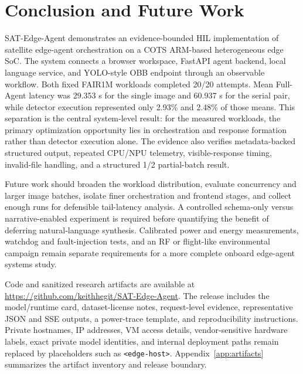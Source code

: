 \documentclass[10pt,letterpaper]{article}
\renewcommand{\thesection}{\Roman{section}}
\begin{document}
\section{Conclusion and Future Work}

SAT-Edge-Agent demonstrates an evidence-bounded HIL implementation of satellite edge-agent orchestration on a COTS ARM-based heterogeneous edge SoC. The system connects a browser workspace, FastAPI agent backend, local language service, and YOLO-style OBB endpoint through an observable workflow. Both fixed FAIR1M workloads completed 20/20 attempts. Mean Full-Agent latency was 29.353 s for the single image and 60.937 s for the serial pair, while detector execution represented only 2.93\% and 2.48\% of those means. This separation is the central system-level result: for the measured workloads, the primary optimization opportunity lies in orchestration and response formation rather than detector execution alone. The evidence also verifies metadata-backed structured output, repeated CPU/NPU telemetry, visible-response timing, invalid-file handling, and a structured 1/2 partial-batch result.

Future work should broaden the workload distribution, evaluate concurrency and larger image batches, isolate finer orchestration and frontend stages, and collect enough runs for defensible tail-latency analysis. A controlled schema-only versus narrative-enabled experiment is required before quantifying the benefit of deferring natural-language synthesis. Calibrated power and energy measurements, watchdog and fault-injection tests, and an RF or flight-like environmental campaign remain separate requirements for a more complete onboard edge-agent systems study.

Code and sanitized research artifacts are available at \url{https://github.com/keithhegit/SAT-Edge-Agent}. The release includes the model/runtime card, dataset-license notes, request-level evidence, representative JSON and SSE outputs, a power-trace template, and reproducibility instructions. Private hostnames, IP addresses, VM access details, vendor-sensitive hardware labels, exact private model identities, and internal deployment paths remain replaced by placeholders such as \texttt{<edge-host>}. Appendix~\ref{app:artifacts} summarizes the artifact inventory and release boundary.

\clearpage
\appendix
\renewcommand{\thesection}{Appendix \Alph{section}}

\clearpage
\end{document}
